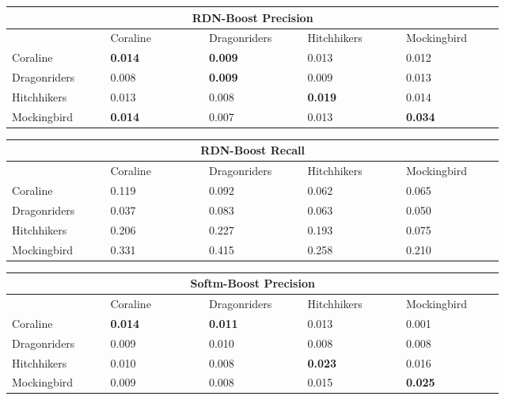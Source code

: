 \documentclass[letterpaper]{article}
\begin{document}
\begin{table}[ht]
\centering

        \begin{tabular}{|p{0.15\linewidth}|p{0.15\linewidth}|p{0.15\linewidth}|p{0.15\linewidth}|p{0.15\linewidth}|}
        \hline
        \multicolumn{5}{|c|}{RDN-Boost Precision}\\
        \hline
            & Coraline & Dragonriders & Hitchhikers & Mockingbird \\
            \hline
             Coraline & \textbf{0.014} & \textbf{0.009} & 0.013 & 0.012 \\
             Dragonriders & 0.008 & \textbf{0.009} & 0.009 & 0.013 \\
             Hitchhikers & 0.013 & 0.008 & \textbf{0.019} & 0.014 \\
             Mockingbird & \textbf{0.014} & 0.007 & 0.013 & \textbf{0.034} \\
        \hline
        \end{tabular}
        
        \begin{tabular}{|p{0.15\linewidth}|p{0.15\linewidth}|p{0.15\linewidth}|p{0.15\linewidth}|p{0.15\linewidth}|}
        \hline
        \multicolumn{5}{|c|}{RDN-Boost Recall}\\
        \hline
            & Coraline & Dragonriders & Hitchhikers & Mockingbird\\
            \hline
            Coraline & 0.119 & 0.092 & 0.062 & 0.065 \\
            Dragonriders & 0.037 & 0.083 & 0.063 & 0.050 \\
            Hitchhikers & 0.206 & 0.227 & 0.193 & 0.075 \\
            Mockingbird & 0.331 & 0.415 & 0.258 & 0.210 \\
        \hline
        \end{tabular}
        
        \begin{tabular}{|p{0.15\linewidth}|p{0.15\linewidth}|p{0.15\linewidth}|p{0.15\linewidth}|p{0.15\linewidth}|}
        \hline
        \multicolumn{5}{|c|}{Softm-Boost Precision}\\
        \hline
            & Coraline & Dragonriders & Hitchhikers & Mockingbird \\
            \hline
             Coraline & \textbf{0.014} & \textbf{0.011} & 0.013 & 0.001 \\
             Dragonriders & 0.009 & 0.010 & 0.008 & 0.008 \\
             Hitchhikers & 0.010 & 0.008 & \textbf{0.023} & 0.016 \\
             Mockingbird & 0.009 & 0.008 & 0.015 & \textbf{0.025} \\
        \hline
        \end{tabular}
        

\end{table}
\end{document}

